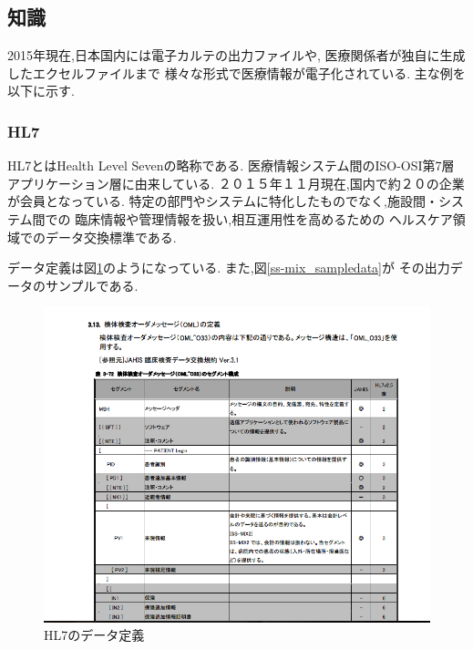 \subsection{知識}
  2015年現在,日本国内には電子カルテの出力ファイルや,
  医療関係者が独自に生成したエクセルファイルまで
  様々な形式で医療情報が電子化されている.
  主な例を以下に示す.

  \subsubsection{HL7}
  HL7とはHealth Level Sevenの略称である.
  医療情報システム間のISO-OSI第7層アプリケーション層に由来している.
  ２０１５年１１月現在,国内で約２０の企業が会員となっている.
  特定の部門やシステムに特化したものでなく,施設間・システム間での
  臨床情報や管理情報を扱い,相互運用性を高めるための
  ヘルスケア領域でのデータ交換標準である.\cite{bibi5} \cite{bibi6}

  データ定義は図\ref{ss-mix_sample}のようになっている.
  また,図\ref{ss-mix_sampledata}が
  その出力データのサンプルである.

	\begin{figure}[htbp]
    \begin{center}
			\includegraphics[width=12cm, bb=0 0 792 630]{./gazou/ss-mix_sample.png} %
    \end{center}
    \caption{HL7のデータ定義}
		\label{ss-mix_sample}
	\end{figure}

